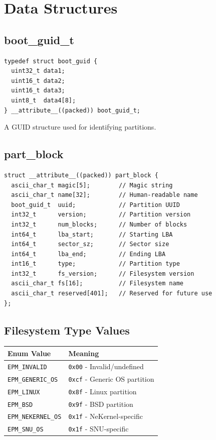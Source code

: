 \documentclass[12pt]{article}
\begin{document}
\section{Data Structures}

\subsection{boot\_guid\_t}
\begin{lstlisting}[style=customc]
typedef struct boot_guid {
  uint32_t data1;
  uint16_t data2;
  uint16_t data3;
  uint8_t  data4[8];
} __attribute__((packed)) boot_guid_t;
\end{lstlisting}
A GUID structure used for identifying partitions.

\subsection{part\_block}
\begin{lstlisting}[style=customc]
struct __attribute__((packed)) part_block {
  ascii_char_t magic[5];        // Magic string
  ascii_char_t name[32];        // Human-readable name
  boot_guid_t  uuid;            // Partition UUID
  int32_t      version;         // Partition version
  int32_t      num_blocks;      // Number of blocks
  int64_t      lba_start;       // Starting LBA
  int64_t      sector_sz;       // Sector size
  int64_t      lba_end;         // Ending LBA
  int16_t      type;            // Partition type
  int32_t      fs_version;      // Filesystem version
  ascii_char_t fs[16];          // Filesystem name
  ascii_char_t reserved[401];   // Reserved for future use
};
\end{lstlisting}

\subsection*{Filesystem Type Values}
\begin{longtable}{|l|l|}
\hline
\textbf{Enum Value} & \textbf{Meaning} \\
\hline
\texttt{EPM\_INVALID} & \texttt{0x00} - Invalid/undefined \\
\texttt{EPM\_GENERIC\_OS} & \texttt{0xcf} - Generic OS partition \\
\texttt{EPM\_LINUX} & \texttt{0x8f} - Linux partition \\
\texttt{EPM\_BSD} & \texttt{0x9f} - BSD partition \\
\texttt{EPM\_NEKERNEL\_OS} & \texttt{0x1f} - NeKernel-specific \\
\texttt{EPM\_SNU\_OS} & \texttt{0x1f} - SNU-specific \\
\hline
\end{longtable}
\end{document}
